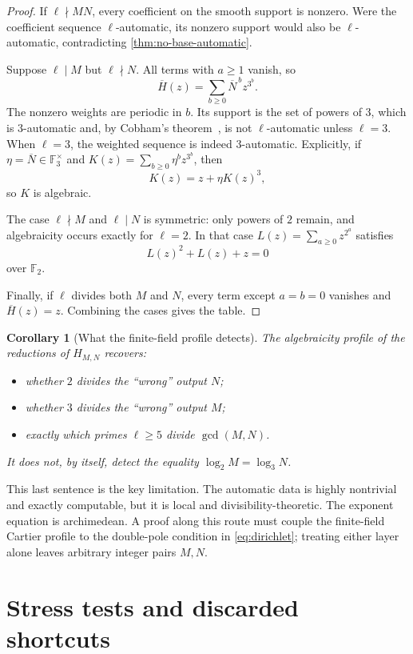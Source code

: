 \documentclass[11pt]{article}
\newtheorem{corollary}[theorem]{Corollary}
\theoremstyle{definition}
\newcommand{\F}{\mathbb{F}}
\begin{document}
\begin{proof}
If $\ell\nmid MN$, every coefficient on the smooth support is nonzero.  Were
the coefficient sequence $\ell$-automatic, its nonzero support would also be
$\ell$-automatic, contradicting \cref{thm:no-base-automatic}.

Suppose $\ell\mid M$ but $\ell\nmid N$.  All terms with $a\geq1$ vanish, so
\[
       \overline H(z)=\sum_{b\geq0}\overline N^{\,b}z^{3^b}.
\]
The nonzero weights are periodic in $b$.  Its support is the set of powers of
$3$, which is $3$-automatic and, by Cobham's theorem~\cite{Cobham}, is not
$\ell$-automatic unless $\ell=3$.  When $\ell=3$, the weighted sequence is
indeed $3$-automatic.  Explicitly, if $\eta=\overline N\in\F_3^\times$ and
$K(z)=\sum_{b\geq0}\eta^b z^{3^b}$, then
\[
            K(z)=z+\eta K(z)^3,
\]
so $K$ is algebraic.

The case $\ell\nmid M$ and $\ell\mid N$ is symmetric: only powers of $2$
remain, and algebraicity occurs exactly for $\ell=2$.  In that case
$L(z)=\sum_{a\geq0}z^{2^a}$ satisfies
\[
            L(z)^2+L(z)+z=0
\]
over $\F_2$.

Finally, if $\ell$ divides both $M$ and $N$, every term except $a=b=0$
vanishes and $\overline H(z)=z$.  Combining the cases gives the table.
\end{proof}

\begin{corollary}[What the finite-field profile detects]
The algebraicity profile of the reductions of $H_{M,N}$ recovers:
\begin{itemize}
\item whether $2$ divides the ``wrong'' output $N$;
\item whether $3$ divides the ``wrong'' output $M$;
\item exactly which primes $\ell\geq5$ divide $\gcd(M,N)$.
\end{itemize}
It does not, by itself, detect the equality
$\log_2M=\log_3N$.
\end{corollary}

This last sentence is the key limitation.  The automatic data is highly
nontrivial and exactly computable, but it is local and divisibility-theoretic.
The exponent equation is archimedean.  A proof along this route must couple the
finite-field Cartier profile to the double-pole condition in
\cref{eq:dirichlet}; treating either layer alone leaves arbitrary integer
pairs $M,N$.

\section{Stress tests and discarded shortcuts}
\end{document}

